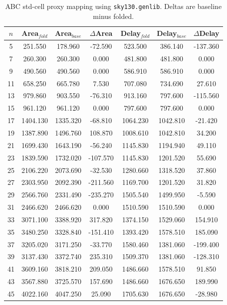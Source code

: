 \begin{table}[t]
\centering
\caption{ABC std-cell proxy mapping using \texttt{sky130.genlib}. Deltas are baseline minus folded.}
\label{tab:stdcell_sky130_genlib}
\begin{tabular}{ccccccc}
\hline
$n$ & Area$_{fold}$ & Area$_{base}$ & $\Delta$Area & Delay$_{fold}$ & Delay$_{base}$ & $\Delta$Delay \\
\hline
5 & 251.550 & 178.960 & -72.590 & 523.500 & 386.140 & -137.360 \\
7 & 260.300 & 260.300 & 0.000 & 481.800 & 481.800 & 0.000 \\
9 & 490.560 & 490.560 & 0.000 & 586.910 & 586.910 & 0.000 \\
11 & 658.250 & 665.780 & 7.530 & 707.080 & 734.690 & 27.610 \\
13 & 979.860 & 903.550 & -76.310 & 913.160 & 797.600 & -115.560 \\
15 & 961.120 & 961.120 & 0.000 & 797.600 & 797.600 & 0.000 \\
17 & 1404.130 & 1335.320 & -68.810 & 1064.230 & 1042.810 & -21.420 \\
19 & 1387.890 & 1496.760 & 108.870 & 1008.610 & 1042.810 & 34.200 \\
21 & 1699.430 & 1643.190 & -56.240 & 1145.830 & 1194.940 & 49.110 \\
23 & 1839.590 & 1732.020 & -107.570 & 1145.830 & 1201.520 & 55.690 \\
25 & 2106.220 & 2073.690 & -32.530 & 1280.660 & 1318.520 & 37.860 \\
27 & 2303.950 & 2092.390 & -211.560 & 1169.700 & 1201.520 & 31.820 \\
29 & 2566.760 & 2331.490 & -235.270 & 1505.540 & 1499.950 & -5.590 \\
31 & 2466.620 & 2466.620 & 0.000 & 1510.590 & 1510.590 & 0.000 \\
33 & 3071.100 & 3388.920 & 317.820 & 1374.150 & 1529.060 & 154.910 \\
35 & 3480.250 & 3328.840 & -151.410 & 1393.420 & 1578.510 & 185.090 \\
37 & 3205.020 & 3171.250 & -33.770 & 1580.460 & 1381.060 & -199.400 \\
39 & 3137.430 & 3372.740 & 235.310 & 1509.370 & 1381.060 & -128.310 \\
41 & 3609.160 & 3818.210 & 209.050 & 1486.660 & 1578.510 & 91.850 \\
43 & 3567.880 & 3725.570 & 157.690 & 1486.660 & 1676.650 & 189.990 \\
45 & 4022.160 & 4047.250 & 25.090 & 1705.630 & 1676.650 & -28.980 \\

\end{tabular}
\end{table}
